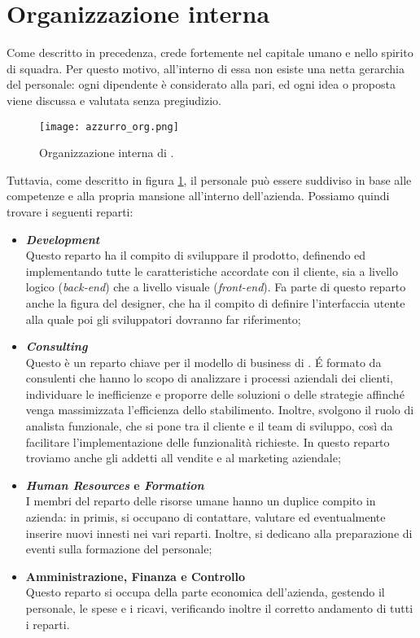 \section{Organizzazione interna}
Come descritto in precedenza, \AD{} crede fortemente nel capitale umano e nello spirito di squadra. Per questo motivo, all'interno di essa non esiste una netta gerarchia del personale: ogni dipendente è considerato alla pari, ed ogni idea o proposta viene discussa e valutata senza pregiudizio. \\

\begin{figure}[h]
\texttt{[image: azzurro\_org.png]}
\centering
\caption{Organizzazione interna di \AD .}
\label{fig:azzurro-org}
\end{figure}

Tuttavia, come descritto in figura \ref{fig:azzurro-org}, il personale può essere suddiviso in base alle competenze e alla propria mansione all'interno dell'azienda. Possiamo quindi trovare i seguenti reparti:
\begin{itemize}
\item \textbf{\textit{Development}}\\
Questo reparto ha il compito di sviluppare il prodotto, definendo ed implementando tutte le caratteristiche accordate con il cliente, sia a livello logico (\textit{back-end}) che a livello visuale (\textit{front-end}). Fa parte di questo reparto anche la figura del designer, che ha il compito di definire l'interfaccia utente alla quale poi gli sviluppatori dovranno far riferimento;  
\item \textbf{\textit{Consulting}}\\
Questo è un reparto chiave per il modello di business di \AD{}. \'E formato da consulenti che hanno lo scopo di analizzare i processi aziendali dei clienti, individuare le inefficienze e proporre delle soluzioni o delle strategie affinché venga massimizzata l'efficienza dello stabilimento. Inoltre, svolgono il ruolo di analista funzionale, che si pone tra il cliente e il team di sviluppo, così da facilitare l'implementazione delle funzionalità richieste. In questo reparto troviamo anche gli addetti all vendite e al marketing aziendale;
\item \textbf{\textit{Human Resources} e \textit{Formation}}\\
I membri del reparto delle risorse umane hanno un duplice compito in azienda: in primis, si occupano di contattare, valutare ed eventualmente inserire nuovi innesti nei vari reparti. Inoltre, si dedicano alla preparazione di eventi sulla formazione del personale;
\item \textbf{Amministrazione, Finanza e Controllo}\\
Questo reparto si occupa della parte economica dell'azienda, gestendo il personale, le spese e i ricavi, verificando inoltre il corretto andamento di tutti i reparti.
\end{itemize}

